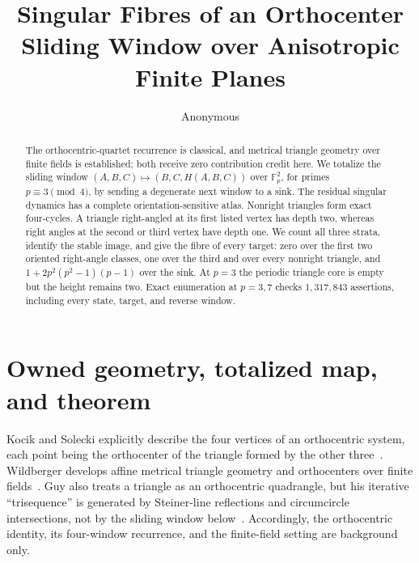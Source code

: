 \documentclass[a4paper,10pt]{amsart}
\title[Singular fibres of an orthocenter window]{Singular Fibres of an Orthocenter Sliding Window over Anisotropic Finite Planes}
\author{Anonymous}
\date{}
\theoremstyle{remark}
\begin{document}
\begin{abstract}
The orthocentric-quartet recurrence is classical, and metrical triangle
geometry over finite fields is established; both receive zero contribution
credit here.  We totalize the sliding window
$(A,B,C)\mapsto(B,C,H(A,B,C))$ over $\mathbb F_p^2$, for primes
$p\equiv3\pmod4$, by sending a degenerate next window to a sink.  The
residual singular dynamics has a complete orientation-sensitive atlas.
Nonright triangles form exact four-cycles.  A triangle right-angled at its
first listed vertex has depth two, whereas right angles at the second or
third vertex have depth one.  We count all three strata, identify the stable
image, and give the fibre of every target: zero over the first two oriented
right-angle classes, one over the third and over every nonright triangle,
and $1+2p^2(p^2-1)(p-1)$ over the sink.  At $p=3$ the periodic triangle core
is empty but the height remains two.  Exact enumeration at $p=3,7$ checks
$1{,}317{,}843$ assertions, including every state, target, and reverse
window.
\end{abstract}

\maketitle

\section{Owned geometry, totalized map, and theorem}\label{sec:setup}

Kocik and Solecki explicitly describe the four vertices of an orthocentric
system, each point being the orthocenter of the triangle formed by the other
three~\cite{KocikSolecki2009}.  Wildberger develops affine metrical triangle
geometry and orthocenters over finite fields~\cite{Wildberger2008}.  Guy also
treats a triangle as an orthocentric quadrangle, but his iterative
``trisequence'' is generated by Steiner-line reflections and circumcircle
intersections, not by the sliding window below~\cite{Guy2019}.  Accordingly,
the orthocentric identity, its four-window recurrence, and the finite-field
setting are background only.
\end{document}
